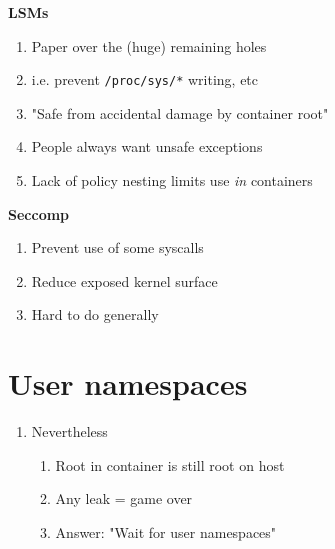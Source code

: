 \documentclass{beamer}
\begin{document}
\begin{frame}
\textbf{LSMs}
\begin{enumerate}
\item Paper over the (huge) remaining holes
\item i.e. prevent {\tt /proc/sys/*} writing, etc
\item "Safe from accidental damage by container root"
\item People always want unsafe exceptions
\item Lack of policy nesting limits use {\em in} containers
\end{enumerate}

\vspace{0.25in}

\textbf{Seccomp}
\begin{enumerate}
\item Prevent use of some syscalls
\item Reduce exposed kernel surface
\item Hard to do generally
\end{enumerate}
\end{frame}

\section{User namespaces}
\begin{frame}
\begin{enumerate}
\item Nevertheless
	\begin{enumerate}
	\item Root in container is still root on host
	\item Any leak = game over
	\item Answer: "Wait for user namespaces"
	\end{enumerate}
\end{enumerate}
\end{frame}
\end{document}
